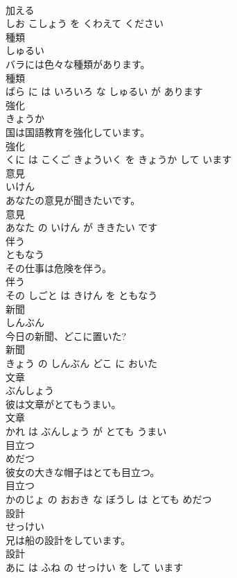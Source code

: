 \documentclass[8pt]{extreport}
\begin{document}
\begin{CJK}{UTF8}{min}
\\	加える 
\\	しお こしょう を くわえて ください			
\\	種類	
\\	しゅるい			
\\	バラには色々な種類があります。	
\\	種類 
\\	ばら に は いろいろ な しゅるい が あります			
\\	強化	
\\	きょうか			
\\	国は国語教育を強化しています。	
\\	強化 
\\	くに は こくご きょういく を きょうか して います			
\\	意見	
\\	いけん			
\\	あなたの意見が聞きたいです。	
\\	意見 
\\	あなた の いけん が ききたい です			
\\	伴う	
\\	ともなう			
\\	その仕事は危険を伴う。	
\\	伴う 
\\	その しごと は きけん を ともなう			
\\	新聞	
\\	しんぶん			
\\	今日の新聞、どこに置いた?	
\\	新聞 
\\	きょう の しんぶん どこ に おいた			
\\	文章	
\\	ぶんしょう			
\\	彼は文章がとてもうまい。	
\\	文章 
\\	かれ は ぶんしょう が とても うまい			
\\	目立つ	
\\	めだつ			
\\	彼女の大きな帽子はとても目立つ。	
\\	目立つ 
\\	かのじょ の おおき な ぼうし は とても めだつ			
\\	設計	
\\	せっけい			
\\	兄は船の設計をしています。	
\\	設計 
\\	あに は ふね の せっけい を して います			

\end{CJK}
\end{document}
